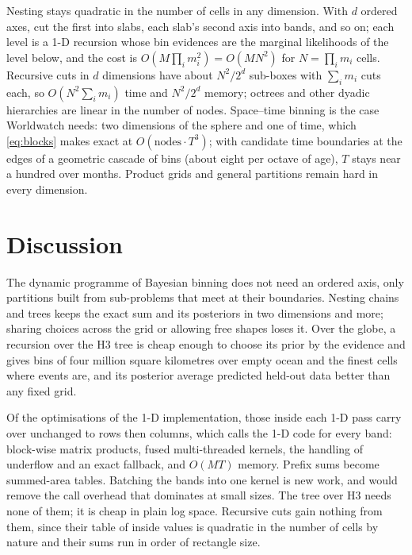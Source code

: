 \documentclass[11pt,a4paper]{article}
\begin{document}
Nesting stays quadratic in the number of cells in any dimension. With $d$ ordered axes, cut the
first into slabs, each slab's second axis into bands, and so on; each level is a 1-D recursion
whose bin evidences are the marginal likelihoods of the level below, and the cost is $O(M
\prod_i m_i^2) = O(MN^2)$ for $N = \prod_i m_i$ cells. Recursive cuts in $d$ dimensions have about
$N^2/2^d$ sub-boxes with $\sum_i m_i$ cuts each, so $O(N^2 \sum_i m_i)$ time and $N^2/2^d$ memory;
octrees and other dyadic hierarchies are linear in the number of nodes. Space--time binning is the
case Worldwatch needs: two dimensions of the sphere and one of time, which \cref{eq:blocks} makes
exact at $O(\text{nodes} \cdot T^3)$; with candidate time boundaries at the edges of a geometric
cascade of bins (about eight per octave of age), $T$ stays near a hundred over months. Product
grids and general partitions remain hard in every dimension.

\section{Discussion}

The dynamic programme of Bayesian binning does not need an ordered axis, only partitions built from
sub-problems that meet at their boundaries. Nesting chains and trees keeps the exact sum and its
posteriors in two dimensions and more; sharing choices across the grid or allowing free shapes loses
it. Over the globe, a recursion over the H3 tree is cheap enough to choose its prior by the evidence
and gives bins of four million square kilometres over empty ocean and the finest cells where events
are, and its posterior average predicted held-out data better than any fixed grid.

Of the optimisations of the 1-D implementation, those inside each 1-D pass carry over unchanged to
rows then columns, which calls the 1-D code for every band: block-wise matrix products, fused
multi-threaded kernels, the handling of underflow and an exact fallback, and $O(MT)$ memory.
Prefix sums become summed-area tables. Batching the bands into one kernel is new work, and would
remove the call overhead that dominates at small sizes. The tree over H3 needs none of them; it is
cheap in plain log space. Recursive cuts gain nothing from them, since their table of inside values
is quadratic in the number of cells by nature and their sums run in order of rectangle size.
\end{document}
